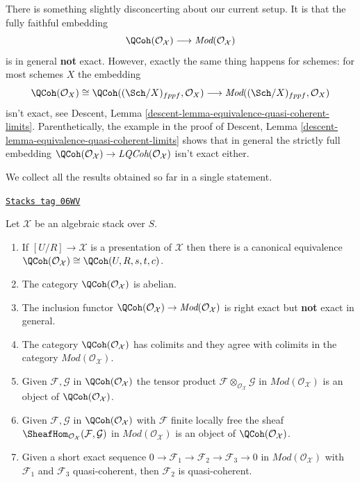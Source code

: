 \medskip\noindent
There is something slightly disconcerting about our current setup.
It is that the fully faithful embedding
$$
\QCoh(\mathcal{O}_\mathcal{X})
\longrightarrow
\textit{Mod}(\mathcal{O}_\mathcal{X})
$$
is in general {\bf not} exact. However, exactly the same thing happens
for schemes: for most schemes $X$ the embedding
$$
\QCoh(\mathcal{O}_X) \cong
\QCoh((\Sch/X)_{fppf}, \mathcal{O}_X) \longrightarrow
\textit{Mod}((\Sch/X)_{fppf}, \mathcal{O}_X)
$$
isn't exact, see
Descent, Lemma \ref{descent-lemma-equivalence-quasi-coherent-limits}.
Parenthetically, the example in the proof of
Descent, Lemma \ref{descent-lemma-equivalence-quasi-coherent-limits}
shows that in general the strictly full embedding
$\QCoh(\mathcal{O}_\mathcal{X}) \to
\textit{LQCoh}(\mathcal{O}_\mathcal{X})$ isn't exact either.

\medskip\noindent
We collect all the results obtained so far in a single statement.

\begin{lemma}
\label{stacks-sheaves-lemma-quasi-coherent-algebraic-stack}
\href{https://stacks.math.columbia.edu/tag/06WV}{\texttt{Stacks tag 06WV}}

Let $\mathcal{X}$ be an algebraic stack over $S$.
\begin{enumerate}
\item If $[U/R] \to \mathcal{X}$ is a presentation of $\mathcal{X}$
then there is a canonical equivalence
$\QCoh(\mathcal{O}_\mathcal{X}) \cong
\QCoh(U, R, s, t, c)$.
\item The category $\QCoh(\mathcal{O}_\mathcal{X})$ is abelian.
\item The inclusion functor $\QCoh(\mathcal{O}_\mathcal{X}) \to
\textit{Mod}(\mathcal{O}_\mathcal{X})$ is right exact but
{\bf not} exact in general.
\item The category $\QCoh(\mathcal{O}_\mathcal{X})$
has colimits and they agree with colimits in the category
$\textit{Mod}(\mathcal{O}_\mathcal{X})$.
\item Given $\mathcal{F}, \mathcal{G}$ in
$\QCoh(\mathcal{O}_\mathcal{X})$
the tensor product $\mathcal{F} \otimes_{\mathcal{O}_\mathcal{X}} \mathcal{G}$
in $\textit{Mod}(\mathcal{O}_\mathcal{X})$
is an object of $\QCoh(\mathcal{O}_\mathcal{X})$.
\item Given $\mathcal{F}, \mathcal{G}$ in
$\QCoh(\mathcal{O}_\mathcal{X})$
with $\mathcal{F}$ finite locally free the sheaf
$\SheafHom_{\mathcal{O}_\mathcal{X}}(\mathcal{F}, \mathcal{G})$
in $\textit{Mod}(\mathcal{O}_\mathcal{X})$
is an object of $\QCoh(\mathcal{O}_\mathcal{X})$.
\item Given a short exact sequence
$0 \to \mathcal{F}_1 \to \mathcal{F}_2 \to \mathcal{F}_3 \to 0$
in $\textit{Mod}(\mathcal{O}_\mathcal{X})$
with $\mathcal{F}_1$ and $\mathcal{F}_3$ quasi-coherent, then
$\mathcal{F}_2$ is quasi-coherent.
\end{enumerate}
\end{lemma}


